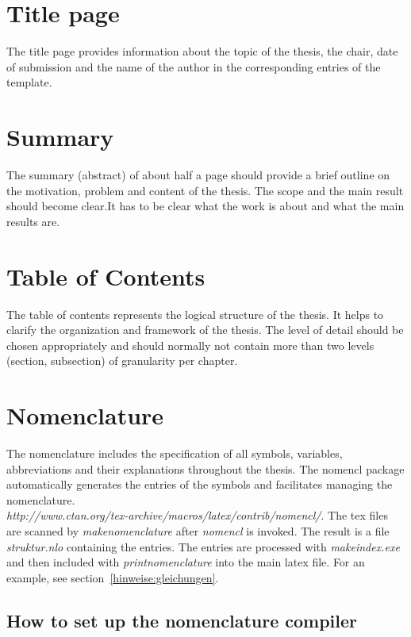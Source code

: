 \section{Title page}
\label{hinweise:titelblatt}

The title page provides information about the topic of the thesis, the chair, date of submission and the name of the author in the corresponding entries of the template.

\section{Summary}
\label{hinweise:kurzfassung}

The summary (abstract) of about half a page should provide a brief outline on the motivation, problem and content of the thesis. The scope and the main result should become clear.It has to be clear what the work is about and what the main results are.


\section{Table of Contents}
\label{hinweise:inhaltsverzeichnis}

The table of contents represents the logical structure of the thesis.
It helps to clarify the organization and framework of the thesis.
The level of detail should be chosen appropriately and should normally not contain more than two levels (section, subsection) of granularity per chapter.

\section{Nomenclature}
\label{hinweise:nomenklatur}

The nomenclature includes the specification of all symbols, variables, abbreviations and their explanations throughout the thesis.
The nomencl package automatically generates the entries of the symbols and facilitates
managing the nomenclature.\\
\emph{http://www.ctan.org/tex-archive/macros/latex/contrib/nomencl/}.
The tex files are scanned by \textit{makenomenclature} after \textit{nomencl} is invoked.
The result is a file \textit{struktur.nlo} containing the entries.
The entries are processed with \textit{makeindex.exe} and then included with \textit{printnomenclature} into the main latex file.
For an example, see section~\ref{hinweise:gleichungen}.

\subsection*{How to set up the nomenclature compiler}

